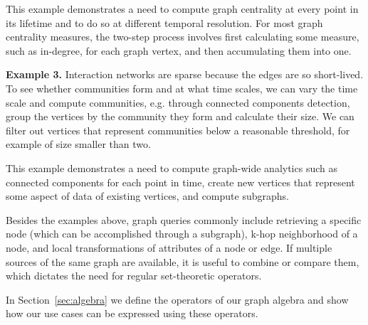 This example demonstrates a need to compute graph centrality at every
point in its lifetime and to do so at different temporal resolution.
For most graph centrality measures, the two-step process involves
first calculating some measure, such as in-degree, for each graph
vertex, and then accumulating them into one.

{\bf Example 3.}  Interaction networks are sparse because the edges
are so short-lived.  To see whether communities form and at what time
scales, we can vary the time scale and compute communities,
e.g. through connected components detection, group the vertices by the
community they form and calculate their size.  We can filter out
vertices that represent communities below a reasonable threshold, for
example of size smaller than two.

This example demonstrates a need to compute graph-wide analytics such
as connected components for each point in time, create new vertices
that represent some aspect of data of existing vertices, and compute
subgraphs.

Besides the examples above, graph queries commonly include retrieving
a specific node (which can be accomplished through a subgraph), k-hop
neighborhood of a node, and local transformations of attributes of a
node or edge.  If multiple sources of the same graph are available, it
is useful to combine or compare them, which dictates the need for
regular set-theoretic operators.

In Section~\ref{sec:algebra} we define the operators of our graph
algebra and show how our use cases can be expressed using these
operators.
